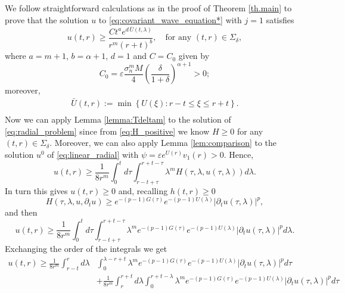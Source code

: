 \documentclass[11pt,reqno]{amsart}
\theoremstyle{definition}
\numberwithin{equation}{section}
\newenvironment{proofof}[1]{\smallskip\noindent{\textbf{Proof~of~#1.}}%
  \hspace{1pt}}{\hspace{-5pt}{\nobreak\quad\nobreak\hfill\nobreak%
    $\square$\vspace{2pt}\par}\smallskip\goodbreak}
\newcommand{\bbar}[1]{\bar{\bar{#1}}}
\newcommand{\e}{\varepsilon}
\newcommand{\eps}{\varepsilon}
\begin{document}
\begin{proofof}{Theorem \ref{th.main.derivative}}
We follow straightforward calculations as in the proof of Theorem \ref{th.main} to prove that the solution $u$ to \eqref{eq:covariant_wave_equation*} with $j=1$ satisfies 
\begin{equation}
\label{eq:step0_derivative}
u(t,r)\geq \frac{Ct^a e^{d\,\bar U(t,\lambda)}} {r^m(r+t)^b}, \quad \text{for any } (t,r)\in \Sigma_\delta,
\end{equation}
where $a=m+1$, $b=\alpha+1$, $d=1$ and $C=C_0$ given by
%
\begin{equation}
C_0=\e\frac{\sigma_n^m M}{4}\left(\frac{\delta}{1+\delta}\right)^{\alpha+1}>0;
\end{equation}
%
moreover, 
\begin{equation}
    \begin{aligned}
\bar U(t,r):=\min\left\{U(\xi): r-t\leq\xi\leq r+t \right\}.\\
\end{aligned}
\end{equation} 
%
Now we can apply Lemma \ref{lemma:Tdeltam} to the solution of \eqref{eq:radial_problem} since from \eqref{eq:H_positive} we know $H\geq 0$ for any $(t,r)\in \Sigma_\delta$. Moreover, we can also apply Lemma \ref{lem:comparison} to the solution $u^0$ of \eqref{eq:linear_radial} with $\psi=\eps e^{U(r)}v_1(r)>0$. Hence,
\begin{equation*}
u(t,r)\geq \frac{1}{8r^m}\int_0^t d\tau \int_{r-t+\tau}^{r+t-\tau}\lambda^m H(\tau,\lambda, u(\tau,\lambda))d\lambda.
\end{equation*}
In turn this gives $u(t,r)\geq 0$ and, recalling $h(t,r)\geq0$
\[ H(\tau,\lambda, u, \partial_t u)\geq e^{-(p-1)G(\tau)}e^{-(p-1)U(\lambda)}|\partial_t u(\tau,\lambda)|^p, \]
%
and then 
%
\begin{equation*}
u(t,r)\geq \frac{1}{8r^m}\int_0^t d\tau \int_{r-t+\tau}^{r+t-\tau}\lambda^m e^{-(p-1)G(\tau)}e^{-(p-1)U(\lambda)}|\partial_t u(\tau,\lambda)|^p d\lambda.    
\end{equation*}
%
Exchanging the order of the integrals we get
%
\begin{equation}
\label{eq:step1_derivative}
\begin{aligned}
u(t,r)\geq \frac{1}{8r^m}\int_{r-t}^r d\lambda &\int_0^{\lambda-r+t} \lambda^m e^{-(p-1)G(\tau)}e^{-(p-1)U(\lambda)}|\partial_t u(\tau,\lambda)|^p d\tau \\
%
&+ \frac{1}{8r^m}\int_r^{r+t} d\lambda \int_0^{r+t-\lambda} \lambda^m e^{-(p-1)G(\tau)}e^{-(p-1)U(\lambda)}|\partial_t u(\tau,\lambda)|^p d\tau \\

\end{aligned}
\end{equation}
\end{proofof}
\end{document}
